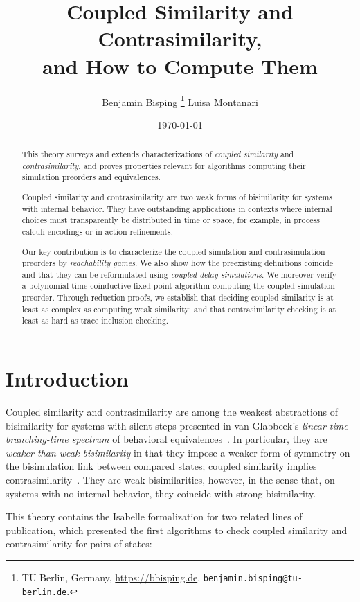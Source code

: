 \documentclass[10pt,a4paper]{article}
\title{ \textbf{Coupled Similarity and Contrasimilarity,} \\ \Large and How to Compute Them }
\author{ Benjamin Bisping%
  \footnote{TU Berlin, Germany,
    \url{https://bbisping.de}, \texttt{benjamin.bisping@tu-berlin.de}.}%
  \qquad Luisa Montanari%
 }
\date{\today}
\begin{document}
\maketitle

\begin{abstract}
\noindent
This theory surveys and extends characterizations of \emph{coupled similarity} and \emph{contrasimilarity},
and proves properties relevant for algorithms computing their simulation preorders and equivalences.

Coupled similarity and contrasimilarity are two weak forms of bisimilarity for systems with
internal behavior.
They have outstanding applications in contexts where internal choices must transparently be
distributed in time or space, for example, in process calculi encodings or in action refinements.

Our key contribution is to characterize the coupled simulation and contrasimulation preorders by \emph{reachability games}.
We also show how the preexisting definitions coincide and that they can be reformulated using \emph{coupled delay simulations}.
We moreover verify a polynomial-time coinductive fixed-point algorithm computing the coupled simulation preorder.
Through reduction proofs, we establish that deciding coupled similarity is at least as complex
as computing weak similarity; and that contrasimilarity checking is at least as hard as trace inclusion
checking.
\end{abstract}

\tableofcontents

\section{Introduction}

Coupled similarity and contrasimilarity are among the weakest abstractions of bisimilarity for systems
with silent steps presented in van Glabbeek's \emph{linear-time--branching-time spectrum} of behavioral
equivalences~\cite{glabbeek1993ltbt}.
In particular, they are \emph{weaker than weak bisimilarity} in that they impose a weaker form of
symmetry on the bisimulation link between compared states; coupled similarity implies
contrasimilarity~\cite{bnp2020coupledsim32}. They are weak bisimilarities, however, in the sense
that, on systems with no internal behavior, they coincide with strong bisimilarity.

This theory contains the Isabelle formalization for two related lines of publication, which presented
the first algorithms to check coupled similarity and contrasimilarity for pairs of states:
\end{document}
